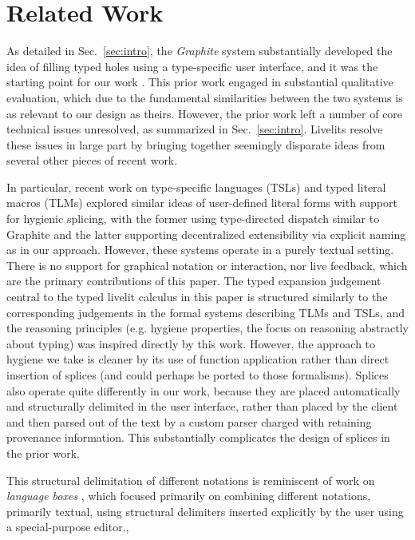 \section{Related Work}\label{sec:related-work}
As detailed in Sec.~\ref{sec:intro},
the \emph{Graphite} system substantially developed the idea of filling 
typed holes using a type-specific user interface, and it was the starting 
point for our work \cite{Graphite}.
This prior work engaged in substantial qualitative evaluation, 
which due to the fundamental similarities between the two systems 
is as relevant to our design as theirs. However, the prior work 
left a number of core technical issues unresolved, 
as summarized in Sec.~\ref{sec:intro}. 
Livelits resolve these issues in large part by bringing together 
seemingly disparate ideas from several other pieces of recent work.

In particular, recent work on type-specific languages (TSLs) \cite{TSLs} 
and typed literal macros (TLMs) \cite{TLMs}
explored similar ideas of user-defined
literal forms with support for hygienic splicing, with the former 
using type-directed dispatch similar to Graphite and the latter supporting 
decentralized extensibility via explicit naming as in our approach. 
However, these systems operate in a purely 
textual setting. There is no support for graphical notation or 
interaction, nor live feedback, which are the primary contributions of this paper.
The typed expansion judgement central to the typed livelit calculus in this paper 
is structured similarly 
to the corresponding judgements in the formal systems describing TLMs and TSLs,
and the reasoning principles (e.g. hygiene properties, the focus on reasoning abstractly 
about typing) was inspired directly by this work. However, the  
approach to hygiene we take is cleaner by its use of function application 
rather than direct insertion of splices (and could perhaps be ported to those formalisms).
Splices also operate quite differently in our work,
because they are placed automatically and structurally delimited in the user interface, rather than 
placed by the client and then parsed out of the text by a custom parser charged 
with retaining provenance information.
This substantially complicates the design of splices in the prior work.

This structural delimitation of different notations is reminiscent of work on 
\emph{language boxes} \cite{DBLP:conf/sle/RenggliDN09}, which focused primarily on 
combining different notations, primarily textual, using structural delimiters inserted 
explicitly by the user using a special-purpose editor.,


